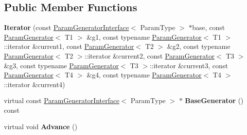 \subsection*{Public Member Functions}
\begin{DoxyCompactItemize}
\item 
\mbox{\label{classtesting_1_1internal_1_1_cartesian_product_generator4_1_1_iterator_ae8081fd9ae3e5192ce4857dd13c4caf7}} 
{\bfseries Iterator} (const \mbox{\hyperlink{classtesting_1_1internal_1_1_param_generator_interface}{Param\+Generator\+Interface}}$<$ Param\+Type $>$ $\ast$base, const \mbox{\hyperlink{classtesting_1_1internal_1_1_param_generator}{Param\+Generator}}$<$ T1 $>$ \&g1, const typename \mbox{\hyperlink{classtesting_1_1internal_1_1_param_generator}{Param\+Generator}}$<$ T1 $>$\+::iterator \&current1, const \mbox{\hyperlink{classtesting_1_1internal_1_1_param_generator}{Param\+Generator}}$<$ T2 $>$ \&g2, const typename \mbox{\hyperlink{classtesting_1_1internal_1_1_param_generator}{Param\+Generator}}$<$ T2 $>$\+::iterator \&current2, const \mbox{\hyperlink{classtesting_1_1internal_1_1_param_generator}{Param\+Generator}}$<$ T3 $>$ \&g3, const typename \mbox{\hyperlink{classtesting_1_1internal_1_1_param_generator}{Param\+Generator}}$<$ T3 $>$\+::iterator \&current3, const \mbox{\hyperlink{classtesting_1_1internal_1_1_param_generator}{Param\+Generator}}$<$ T4 $>$ \&g4, const typename \mbox{\hyperlink{classtesting_1_1internal_1_1_param_generator}{Param\+Generator}}$<$ T4 $>$\+::iterator \&current4)
\item 
\mbox{\label{classtesting_1_1internal_1_1_cartesian_product_generator4_1_1_iterator_a8af64e793761905840c5b878992c31cc}} 
virtual const \mbox{\hyperlink{classtesting_1_1internal_1_1_param_generator_interface}{Param\+Generator\+Interface}}$<$ Param\+Type $>$ $\ast$ {\bfseries Base\+Generator} () const
\item 
\mbox{\label{classtesting_1_1internal_1_1_cartesian_product_generator4_1_1_iterator_a36f5b90a66a2e63f126daabb7723fe36}} 
virtual void {\bfseries Advance} ()
\item 
\mbox{\label{classtesting_1_1internal_1_1_cartesian_product_generator4_1_1_iterator_aa8feaba6e802b8ae3f9241e9c5b61311}} 

\end{DoxyCompactItemize}
